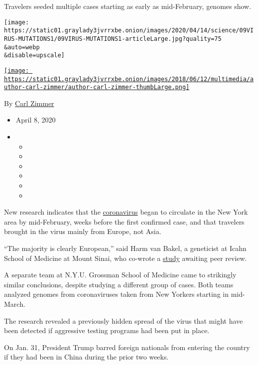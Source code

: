 Travelers seeded multiple cases starting as early as mid-February,
genomes show.

\texttt{[image: https://static01.graylady3jvrrxbe.onion/images/2020/04/14/science/09VIRUS-MUTATIONS1/09VIRUS-MUTATIONS1-articleLarge.jpg?quality=75\\\&auto=webp\\\&disable=upscale]}

\href{https://www.nytimes3xbfgragh.onion/by/carl-zimmer}{\texttt{[image: https://static01.graylady3jvrrxbe.onion/images/2018/06/12/multimedia/author-carl-zimmer/author-carl-zimmer-thumbLarge.png]}}

By \href{https://www.nytimes3xbfgragh.onion/by/carl-zimmer}{Carl Zimmer}

\begin{itemize}
\item
  April 8, 2020
\item
  \begin{itemize}
  \item
  \item
  \item
  \item
  \item
  \item
  \end{itemize}
\end{itemize}

New research indicates that the
\href{https://www.nytimes3xbfgragh.onion/2020/07/04/health/coronavirus-neanderthals.html}{coronavirus}
began to circulate in the New York area by mid-February, weeks before
the first confirmed case, and that travelers brought in the virus mainly
from Europe, not Asia.

``The majority is clearly European,'' said Harm van Bakel, a geneticist
at Icahn School of Medicine at Mount Sinai, who co-wrote a
\href{https://www.medrxiv.org/content/10.1101/2020.04.08.20056929v1}{study}
awaiting peer review.

A separate team at N.Y.U. Grossman School of Medicine came to strikingly
similar conclusions, despite studying a different group of cases. Both
teams analyzed genomes from coronaviruses taken from New Yorkers
starting in mid-March.

The research revealed a previously hidden spread of the virus that might
have been detected if aggressive testing programs had been put in place.

On Jan. 31, President Trump barred foreign nationals from entering the
country if they had been in China during the prior two weeks.

